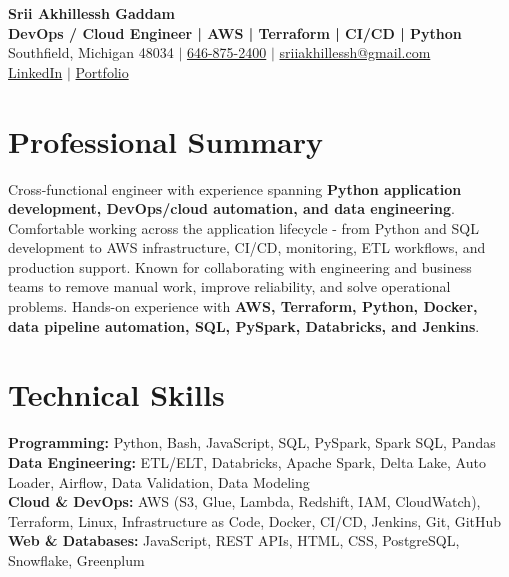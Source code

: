\documentclass[letterpaper,10pt]{article}
\begin{document}
\fontsize{9.35pt}{10.45pt}\selectfont

\begin{center}
    {\LARGE \textbf{Srii Akhillessh Gaddam}} \\[-1pt]
    \textbf{DevOps / Cloud Engineer | AWS | Terraform | CI/CD | Python} \\[2pt]
    Southfield, Michigan 48034 $|$
    \href{tel:6468752400}{646-875-2400} $|$
    \href{mailto:sriiakhillessh@gmail.com}{sriiakhillessh@gmail.com} \\[1pt]
    \href{https://www.linkedin.com/in/srii-akhiilessh-gaddam-b48668191/}{LinkedIn} $|$
    \href{https://sriiakhillesshg.github.io/portfolio/}{Portfolio}
\end{center}
\vspace{-8pt}

\section{Professional Summary}
\small{Cross-functional engineer with experience spanning \textbf{Python application development, DevOps/cloud automation, and data engineering}. Comfortable working across the application lifecycle - from Python and SQL development to AWS infrastructure, CI/CD, monitoring, ETL workflows, and production support. Known for collaborating with engineering and business teams to remove manual work, improve reliability, and solve operational problems. Hands-on experience with \textbf{AWS, Terraform, Python, Docker, data pipeline automation, SQL, PySpark, Databricks, and Jenkins}.}

\section{Technical Skills}
\small{
\textbf{Programming:} Python, Bash, JavaScript, SQL, PySpark, Spark SQL, Pandas \\
\textbf{Data Engineering:} ETL/ELT, Databricks, Apache Spark, Delta Lake, Auto Loader, Airflow, Data Validation, Data Modeling \\
\textbf{Cloud \& DevOps:} AWS (S3, Glue, Lambda, Redshift, IAM, CloudWatch), Terraform, Linux, Infrastructure as Code, Docker, CI/CD, Jenkins, Git, GitHub \\
\textbf{Web \& Databases:} JavaScript, REST APIs, HTML, CSS, PostgreSQL, Snowflake, Greenplum
}
\end{document}
